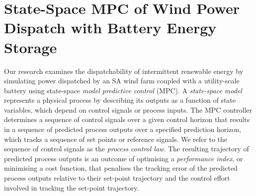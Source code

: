 \documentclass[conference]{IEEEtran}
\begin{document}


\section{State-Space MPC of Wind Power Dispatch with Battery Energy Storage}\label{sect:ssmpc_dispatch}
Our research examines the dispatchability of intermittent renewable energy by simulating power dispatched by an SA wind farm coupled with a utility-scale battery using state-space \textit{model predictive control} (MPC).  A \textit{state-space model} represents a physical process by describing its outputs as a function of state variables, which depend on control signals or process inputs.  The MPC controller determines a sequence of control signals over a given control horizon that results in a sequence of predicted process outputs over a specified prediction horizon, which tracks a sequence of set points or reference signals.  We refer to the sequence of control signals as the \textit{process control law}.  The resulting trajectory of predicted process outputs is an outcome of optimising a \textit{performance index}, or minimising a cost function, that penalises the tracking error of the predicted process outputs relative to their set-point trajectory and the control effort involved in tracking the set-point trajectory.  
\end{document}
